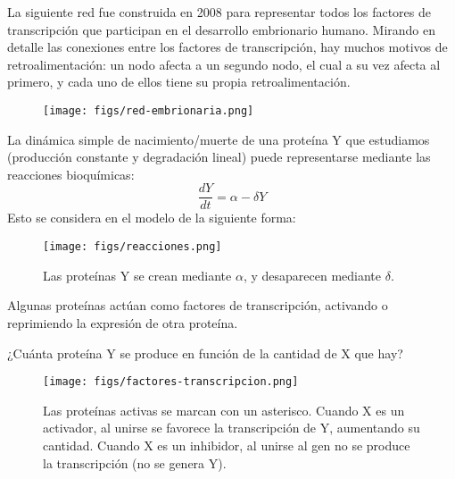 La siguiente red fue construida en 2008 para representar todos los factores de transcripción que participan en el desarrollo embrionario humano. Mirando en detalle las conexiones entre los factores de transcripción, hay muchos motivos de retroalimentación: un nodo afecta a un segundo nodo, el cual a su vez afecta al primero, y cada uno de ellos tiene su propia retroalimentación. 

\begin{figure}[h]
\centering
\texttt{[image: figs/red-embrionaria.png]}
\end{figure}

La dinámica simple de nacimiento/muerte de una proteína Y que estudiamos (producción constante y degradación lineal) puede representarse mediante las reacciones bioquímicas: 
$$\frac{dY}{dt} = \alpha - \delta Y$$
Esto se considera en el modelo de la siguiente forma:
\begin{figure}[h]
\centering
\texttt{[image: figs/reacciones.png]}
\caption{Las proteínas Y se crean mediante $\alpha$, y desaparecen mediante $\delta$.}
\end{figure}

Algunas proteínas actúan como factores de transcripción, activando o reprimiendo la expresión de otra proteína. 

¿Cuánta proteína Y se produce en función de la cantidad de X que hay?
\begin{figure}[h]
\centering
\texttt{[image: figs/factores-transcripcion.png]}
\caption{Las proteínas activas se marcan con un asterisco. Cuando X es un activador, al unirse se favorece la transcripción de Y, aumentando su cantidad. Cuando X es un inhibidor, al unirse al gen no se produce la transcripción (no se genera Y).}
\end{figure}

